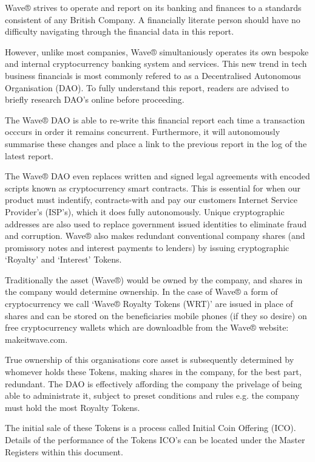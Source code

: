 \documentclass[letterpaper,10pt,openany,oneside,english]{sphinxmanual}
\begin{document}
Wave® strives to operate and report on its banking and finances to a standards consistent of any British Company.
A financially literate person should have no difficulty navigating through the financial data in this report.

However, unlike most companies, Wave® simultaniously operates its own bespoke and internal cryptocurrency banking system and services.
This new trend in tech business financials is most commonly refered to as a Decentralised Autonomous Organisation (DAO).
To fully understand this report, readers are advised to briefly research DAO’s online before proceeding.

The Wave® DAO is able to re-write this financial report each time a transaction occcurs in order it remains concurrent.
Furthermore, it will autonomously summarise these changes and place a link to the previous report in the log of the latest report.

The Wave® DAO even replaces written and signed legal agreements with encoded scripts known as cryptocurrency smart contracts.
This is essential for when our product must indentify, contracts-with and pay our customers Internet Service Provider’s (ISP’s), which it does fully autonomously.
Unique cryptographic addresses are also used to replace government issued identities to eliminate fraud and corruption.
Wave® also makes redundant conventional company shares (and promissory notes and interest payments to lenders) by issuing cryptographic ‘Royalty’ and ‘Interest’ Tokens.

Traditionally the asset (Wave®) would be owned by the company, and shares in the company would determine ownership.
In the case of Wave® a form of cryptocurrency we call ‘Wave® Royalty Tokens (WRT)’ are issued in place of shares and can be stored on the beneficiaries mobile phones (if they so desire) on free cryptocurrency wallets which are downloadble from the Wave®  website: makeitwave.com.

True ownership of this organisations core asset is subsequently determined by whomever holds these Tokens, making shares in the company, for the best part, redundant.
The DAO is effectively affording the company the privelage of being able to administrate it, subject to preset conditions and rules e.g. the company must hold the most Royalty Tokens.

The initial sale of these Tokens is a process called Initial Coin Offering (ICO).
Details of the performance of the Tokens ICO’s can be located under the Master Registers within this document.
\end{document}
